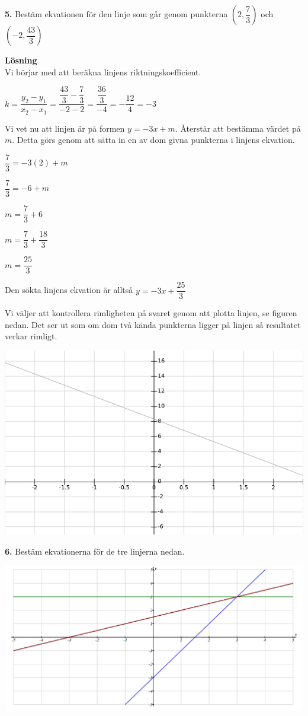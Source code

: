 \documentclass{article}
\begin{document}
\textbf{5.} Bestäm ekvationen för den linje som går genom punkterna $(2,\dfrac{7}{3})$ och $(-2,\dfrac{43}{3})$

\textbf{Lösning}\\
Vi börjar med att beräkna linjens riktningskoefficient.

$k=\dfrac{y_{2}-y_{1}}{x_{2}-x_{1}}=\dfrac{\dfrac{43}{3}-\dfrac{7}{3}}{-2-2}=\dfrac{\dfrac{36}{3}}{-4}=-\dfrac{12}{4}=-3$

Vi vet nu att linjen är på formen $y=-3x+m$. Återstår att bestämma värdet på $m$. Detta görs genom att sätta in en av dom givna punkterna i linjens ekvation.

$\dfrac{7}{3}=-3(2)+m$

$\dfrac{7}{3}=-6+m$

$m=\dfrac{7}{3}+6$

$m=\dfrac{7}{3}+\dfrac{18}{3}$

$m=\dfrac{25}{3}$

Den sökta linjens ekvation är alltså $y=-3x+\dfrac{25}{3}$

Vi väljer att kontrollera rimligheten på svaret genom att plotta linjen, se figuren nedan. Det ser ut som om dom två kända punkterna ligger på linjen så resultatet verkar rimligt.

\includegraphics[scale=0.65]{graph_1_5_1.png}

\textbf{6.} Bestäm ekvationerna för de tre linjerna nedan.

\includegraphics[scale=0.36]{graph_1_6_1.png}
\end{document}
